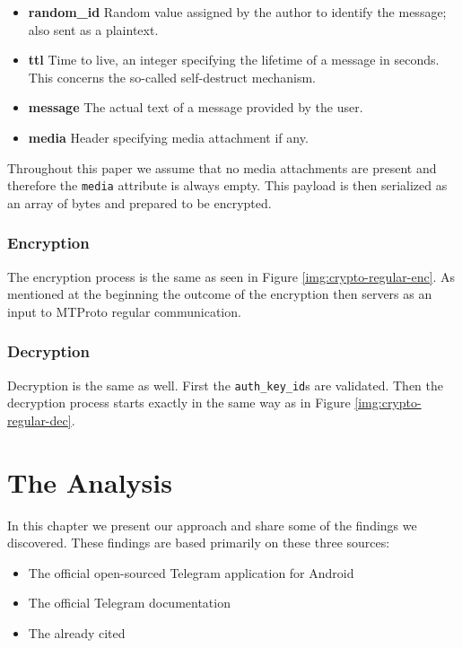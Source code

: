 \documentclass[thesis=M,english]{FITthesis}[2012/10/20]
\begin{document}
\begin{itemize}
	\item \textbf{random\_id} Random value assigned by the author to identify the message; also sent as a plaintext.
	\item  \textbf{ttl} Time to live, an integer specifying the lifetime of a message in seconds. This concerns the so-called self-destruct mechanism.
	\item \textbf{message} The actual text of a message provided by the user.
	\item \textbf{media} Header specifying media attachment if any.
\end{itemize}

Throughout this paper we assume that no media attachments are present and therefore the \texttt{media} attribute is always empty. This payload is then serialized as an array of bytes and prepared to be encrypted.

\subsection{Encryption}\label{crypto-secret-enc}

The encryption process is the same as seen in Figure \ref{img:crypto-regular-enc}. As mentioned at the beginning the outcome of the encryption then servers as an input to MTProto regular communication.

\subsection{Decryption}\label{crypto-secret-dec}

Decryption is the same as well. First the \texttt{auth\_key\_id}s are validated.  Then the decryption process starts exactly in the same way as in Figure \ref{img:crypto-regular-dec}.





\chapter{The Analysis}\label{analysis}

In this chapter we present our approach and share some of the findings we discovered. These findings are based primarily on these three sources:

\begin{itemize}
	\item The official open-sourced Telegram application for Android
	\item The official Telegram documentation
	\item The already cited \cite{telegram-aarhus}
\end{itemize}
\end{document}

